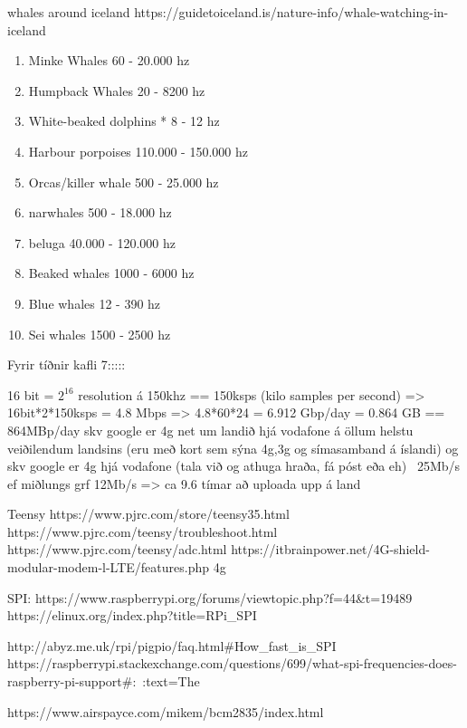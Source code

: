 whales around iceland https://guidetoiceland.is/nature-info/whale-watching-in-iceland
\begin{enumerate}               freq range          
    \item Minke Whales          60 - 20.000 hz      
    \item Humpback Whales       20 - 8200 hz        
    \item White-beaked dolphins * 8 - 12 hz
    \item Harbour porpoises     110.000 - 150.000 hz
    \item Orcas/killer whale    500 - 25.000 hz
    \item narwhales             500 - 18.000 hz  
    \item beluga                40.000 - 120.000 hz
    \item Beaked whales         1000 - 6000 hz
    \item Blue whales           12 - 390 hz
    \item Sei whales            1500 - 2500 hz
\end{enumerate}

Fyrir tíðnir kafli 7:::::

16 bit = $2^16$ resolution á 150khz == 150ksps (kilo samples per second)
=> 16bit*2*150ksps = 4.8 Mbps => 4.8*60*24 = 6.912 Gbp/day = 0.864 GB == 864MBp/day
skv google er 4g net um landið hjá vodafone á öllum helstu veiðilendum landsins (eru með kort sem sýna 4g,3g og símasamband á íslandi)
og skv google er 4g hjá vodafone (tala við og athuga hraða, fá póst eða eh)
~25Mb/s ef miðlungs grf 12Mb/s => ca 9.6 tímar að uploada upp á land


Teensy
https://www.pjrc.com/store/teensy35.html
https://www.pjrc.com/teensy/troubleshoot.html
https://www.pjrc.com/teensy/adc.html
https://itbrainpower.net/4G-shield-modular-modem-l-LTE/features.php     4g

SPI:
https://www.raspberrypi.org/forums/viewtopic.php?f=44&t=19489
https://elinux.org/index.php?title=RPi_SPI

http://abyz.me.uk/rpi/pigpio/faq.html#How_fast_is_SPI
https://raspberrypi.stackexchange.com/questions/699/what-spi-frequencies-does-raspberry-pi-support#:~:text=The%

https://www.airspayce.com/mikem/bcm2835/index.html

